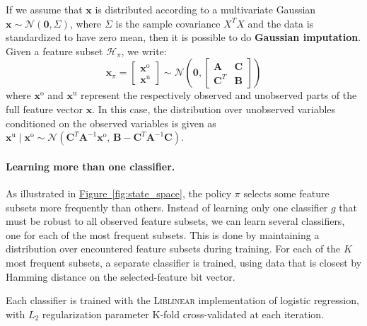 If we assume that $\mathbf{x}$ is distributed according to a multivariate Gaussian $\mathbf{x} \sim \mathcal{N}(\mathbf{0}, \Sigma)$, where $\Sigma$ is the sample covariance $X^T X$ and the data is standardized to have zero mean, then it is possible to do \textbf{Gaussian imputation}.
Given a feature subset $\mathcal{H}_\pi$, we write:
\begin{equation}
\mathbf{x}_\pi = \begin{bmatrix} \mathbf{x}^\text{o}\\  \mathbf{x}^\text{u} \end{bmatrix} \sim \mathcal{N} \left( \mathbf{0}, \begin{bmatrix} \mathbf{A} & \mathbf{C}\\ \mathbf{C}^T & \mathbf{B} \end{bmatrix} \right)
\end{equation}
where $\mathbf{x}^\text{o}$ and $\mathbf{x}^\text{u}$ represent the respectively observed and unobserved parts of the full feature vector $\mathbf{x}$.
In this case, the distribution over unobserved variables conditioned on the observed variables is given as
$\mathbf{x}^\text{u} \mid \mathbf{x}^\text{o} \sim \mathcal{N} \left( \mathbf{C}^T \mathbf{A}^{-1} \mathbf{x}^\text{o},\, \mathbf{B} - \mathbf{C}^T \mathbf{A}^{-1} \mathbf{C} \right)$.

\paragraph{Learning more than one classifier.}
As illustrated in \hyperref[fig:state_space]{Figure~\ref*{fig:state_space}}, the policy $\pi$ selects some feature subsets more frequently than others.
Instead of learning only one classifier $g$ that must be robust to all observed feature subsets, we can learn several classifiers, one for each of the most frequent subsets.
This is done by maintaining a distribution over encountered feature subsets during training.
For each of the $K$ most frequent subsets, a separate classifier is trained, using data that is closest by Hamming distance on the selected-feature bit vector.

Each classifier is trained with the \textsc{Liblinear} implementation of logistic regression, with $L_2$ regularization parameter K-fold cross-validated at each iteration.

